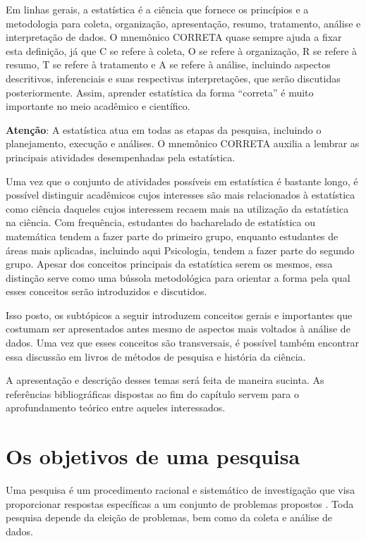 \documentclass[
]{book}
\begin{document}
Em linhas gerais, a estatística é a ciência que fornece os princípios e a metodologia para coleta, organização, apresentação, resumo, tratamento, análise e interpretação de dados. O mnemônico CORRETA quase sempre ajuda a fixar esta definição, já que C se refere à coleta, O se refere à organização, R se refere à resumo, T se refere à tratamento e A se refere à análise, incluindo aspectos descritivos, inferenciais e suas respectivas interpretações, que serão discutidas posteriormente. Assim, aprender estatística da forma ``correta'' é muito importante no meio acadêmico e científico.

\textbf{Atenção}: A estatística atua em todas as etapas da pesquisa, incluindo o planejamento, execução e análises. O mnemônico CORRETA auxilia a lembrar as principais atividades desempenhadas pela estatística.

Uma vez que o conjunto de atividades possíveis em estatística é bastante longo, é possível distinguir acadêmicos cujos interesses são mais relacionados à estatística como ciência daqueles cujos interessem recaem mais na utilização da estatística na ciência. Com frequência, estudantes do bacharelado de estatística ou matemática tendem a fazer parte do primeiro grupo, enquanto estudantes de áreas mais aplicadas, incluindo aqui Psicologia, tendem a fazer parte do segundo grupo. Apesar dos conceitos principais da estatística serem os mesmos, essa distinção serve como uma bússola metodológica para orientar a forma pela qual esses conceitos serão introduzidos e discutidos.

Isso posto, os subtópicos a seguir introduzem conceitos gerais e importantes que costumam ser apresentados antes mesmo de aspectos mais voltados à análise de dados. Uma vez que esses conceitos são transversais, é possível também encontrar essa discussão em livros de métodos de pesquisa e história da ciência.

A apresentação e descrição desses temas será feita de maneira sucinta. As referências bibliográficas dispostas ao fim do capítulo servem para o aprofundamento teórico entre aqueles interessados.

\hypertarget{os-objetivos-de-uma-pesquisa}{%
\section{Os objetivos de uma pesquisa}\label{os-objetivos-de-uma-pesquisa}}

Uma pesquisa é um procedimento racional e sistemático de investigação que visa proporcionar respostas específicas a um conjunto de problemas propostos \citep{gil2002}. Toda pesquisa depende da eleição de problemas, bem como da coleta e análise de dados.
\end{document}
